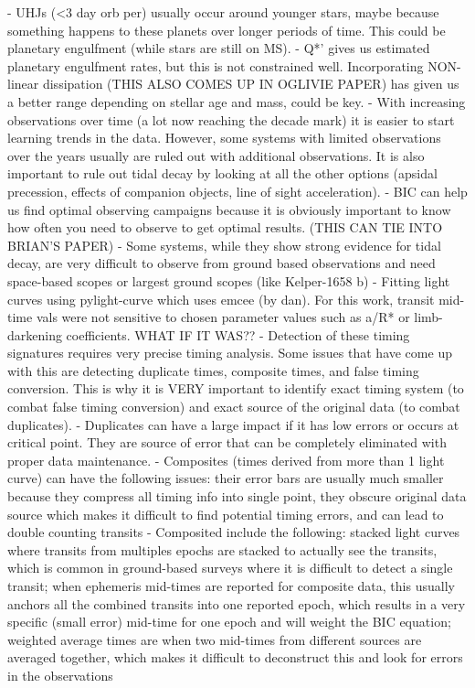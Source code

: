 \documentclass[oneside,12pt]{amsart}
\numberwithin{page}{section}
\begin{document}
- UHJs (<3 day orb per) usually occur around younger stars, maybe because something happens to these planets over longer periods of time. This could be planetary engulfment (while stars are still on MS). 
- Q*' gives us estimated planetary engulfment rates, but this is not constrained well. Incorporating NON-linear dissipation (THIS ALSO COMES UP IN OGLIVIE PAPER) has given us a better range depending on stellar age and mass, could be key. 
- With increasing observations over time (a lot now reaching the decade mark) it is easier to start learning trends in the data. However, some systems with limited observations over the years usually are ruled out with additional observations. It is also important to rule out tidal decay by looking at all the other options (apsidal precession, effects of companion objects, line of sight acceleration).
- BIC can help us find optimal observing campaigns because it is obviously important to know how often you need to observe to get optimal results. (THIS CAN TIE INTO BRIAN'S PAPER)
- Some systems, while they show strong evidence for tidal decay, are very difficult to observe from ground based observations and need space-based scopes or largest ground scopes (like Kelper-1658 b)
- Fitting light curves using pylight-curve which uses emcee (by dan). For this work, transit mid-time vals were not sensitive to chosen parameter values such as a/R* or limb-darkening coefficients. WHAT IF IT WAS?? 
- Detection of these timing signatures requires very precise timing analysis. Some issues that have come up with this are detecting duplicate times, composite times, and false timing conversion. This is why it is VERY important to identify exact timing system (to combat false timing conversion) and exact source of the original data (to combat duplicates). 
- Duplicates can have a large impact if it has low errors or occurs at critical point. They are source of error that can be completely eliminated with proper data maintenance.
- Composites (times derived from more than 1 light curve) can have the following issues: their error bars are usually much smaller because they compress all timing info into single point, they obscure original data source which makes it difficult to find potential timing errors, and can lead to double counting transits
     - Composited include the following: stacked light curves where transits from multiples epochs are stacked to actually see the transits, which is common in ground-based surveys where it is difficult to detect a single transit; when ephemeris mid-times are reported for composite data, this usually anchors all the combined transits into one reported epoch, which results in a very specific (small error) mid-time for one epoch and will weight the BIC equation; weighted average times are when two mid-times from different sources are averaged together, which makes it difficult to deconstruct this and look for errors in the observations
\end{document}
